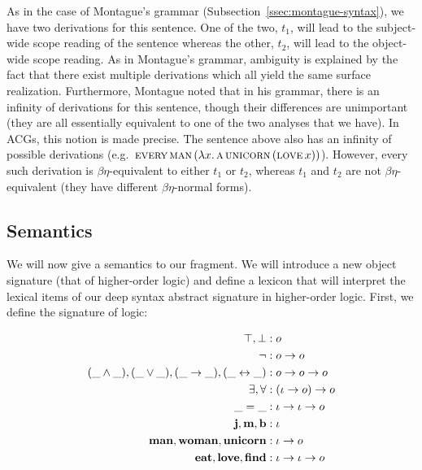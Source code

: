 As in the case of Montague's grammar
(Subsection~\ref{ssec:montague-syntax}), we have two derivations for this
sentence. One of the two, $t_1$, will lead to the subject-wide scope
reading of the sentence whereas the other, $t_2$, will lead to the
object-wide scope reading. As in Montague's grammar, ambiguity is explained
by the fact that there exist multiple derivations which all yield the same
surface realization. Furthermore, Montague noted that in his grammar, there
is an infinity of derivations for this sentence, though their differences
are unimportant (they are all essentially equivalent to one of the two
analyses that we have). In ACGs, this notion is made precise. The sentence
above also has an infinity of possible derivations (e.g.\
$\textsc{every}\,\textsc{man}\,(\lambda x.\, \textsc{a}\,\textsc{unicorn}\,(\textsc{love}\,x))$). However,
every such derivation is $\beta\eta$-equivalent to either $t_1$ or $t_2$,
whereas $t_1$ and $t_2$ are not $\beta\eta$-equivalent (they have different
$\beta\eta$-normal forms).


\subsection{Semantics}
\label{ssec:acg-semantics}

We will now give a semantics to our fragment. We will introduce a new
object signature (that of higher-order logic) and define a lexicon that
will interpret the lexical items of our deep syntax abstract signature in
higher-order logic. First, we define the signature of logic:

\begin{align*}
  \top, \bot &: o \\
  \lnot &: o \to o \\
  (\_ \land \_), (\_ \lor \_), (\_ \to \_), (\_ \leftrightarrow \_) &: o \to o \to o \\
  \exists, \forall &: (\iota \to o) \to o \\
  \_ = \_ &: \iota \to \iota \to o \\
  \textbf{j}, \textbf{m}, \textbf{b} &: \iota \\
  \textbf{man}, \textbf{woman}, \textbf{unicorn} &: \iota \to o \\
  \textbf{eat}, \textbf{love}, \textbf{find} &: \iota \to \iota \to o
\end{align*}

